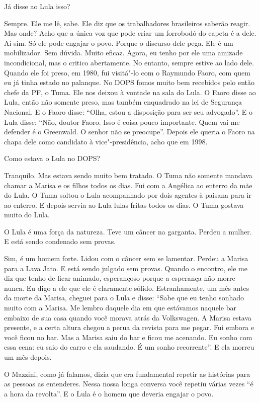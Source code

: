 \falaG Já disse ao Lula isso?

\falaM Sempre. Ele me lê, sabe. Ele diz que os trabalhadores brasileiros
saberão reagir. Mas onde? Acho que a única voz que pode criar um
forrobodó do capeta é a dele. Aí sim. Só ele pode engajar o povo. Porque
o discurso dele pega. Ele é um mobilizador. Sem dúvida. Muito eficaz.
Agora, eu tenho por ele uma amizade incondicional, mas o critico
abertamente. No entanto, sempre estive ao lado dele. Quando ele foi
preso, em 1980, fui visitá"-lo com o Raymundo Faoro, com quem eu já tinha
estado no palanque. No DOPS fomos muito bem recebidos pelo então chefe
da PF, o Tuma. Ele nos deixou à vontade na sala do Lula. O Faoro disse
ao Lula, então não somente preso, mas também enquadrado na lei de
Segurança Nacional. E o Faoro disse: ``Olha, estou a disposição para ser
seu advogado''. E o Lula disse: ``Não, doutor Faoro. Isso é coisa pouco
importante. Quem vai me defender é o Greenwald. O senhor não se
preocupe''. Depois ele queria o Faoro na chapa dele como candidato à
vice"-presidência, acho que em 1998.

\falaG Como estava o Lula no DOPS?

\falaM Tranquilo. Mas estava sendo muito bem tratado. O Tuma não somente
mandava chamar a Marisa e os filhos todos os dias. Fui com a Angélica ao
enterro da mãe do Lula. O Tuma soltou o Lula acompanhado por dois
agentes à paisana para ir ao enterro. E depois servia ao Lula lulas
fritas todos os dias. O Tuma gostava muito do Lula.

\falaG O Lula é uma força da natureza. Teve um câncer na garganta. Perdeu a
mulher. E está sendo condenado sem provas.

\falaM Sim, é um homem forte. Lidou com o câncer sem se lamentar. Perdeu a
Marisa para a Lava Jato. E está sendo julgado sem provas. Quando o
encontro, ele me diz que tenho de ficar animado, esperançoso porque a
esperança não morre nunca. Eu digo a ele que ele é claramente sólido.
Estranhamente, um mês antes da morte da Marisa, cheguei para o Lula e
disse: ``Sabe que eu tenho sonhado muito com a Marisa. Me lembro daquele
dia em que estávamos naquele bar embaixo de sua casa quando você morava
atrás da Volkswagen. A Marisa estava presente, e a certa altura chegou a
perua da revista para me pegar. Fui embora e você ficou no bar. Mas a
Marisa saiu do bar e ficou me acenando. Eu sonho com essa cena: eu saio
do carro e ela saudando. É um sonho recorrente''. E ela morreu um mês
depois.

\falaG O Mazzini, como já falamos, dizia que era fundamental repetir as
histórias para as pessoas as entenderes. Nessa nossa longa conversa você
repetiu várias vezes ``é a hora da revolta''. E o Lula é o homem que
deveria engajar o povo.

